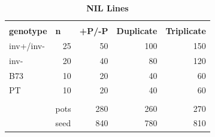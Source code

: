 \documentclass[10pt,letterpaper]{article}
\begin{document}
\begin{table}[!h]
\begin{subtable}{\textwidth}
\centering
\begin{tabular}{lrrrr}
                  & \multicolumn{1}{l}{}           & \multicolumn{1}{l}{}               & \multicolumn{1}{l}{}                   & \multicolumn{1}{l}{}                     \\
\textbf{genotype} & \multicolumn{1}{l}{\textbf{n}} & \multicolumn{1}{l}{\textbf{+P/-P}} & \multicolumn{1}{l}{\textbf{Duplicate}} & \multicolumn{1}{l}{\textbf{Triplicate}}  \\ 
\hline
inv+/inv- & 25                       & 50                        & 100                           & 150                             \\
inv-      & 20                       & 40                        & 80                            & 120                             \\
B73       & 10                       & 20                        & 40                            & 60                              \\
PT        & 10                       & 20                        & 40                            & 60                              \\
                                      \\ 
\cline{2-5}
          & \multicolumn{1}{l}{pots} & 280                       & 260                           & 270                             \\
          & \multicolumn{1}{l}{seed} & 840                       & 780                           & 810                                      
\end{tabular}
\caption{ \textbf{NIL Lines}}
\label{tab:table1_b}
\end{subtable}
\end{table}

\clearpage
\end{document}
